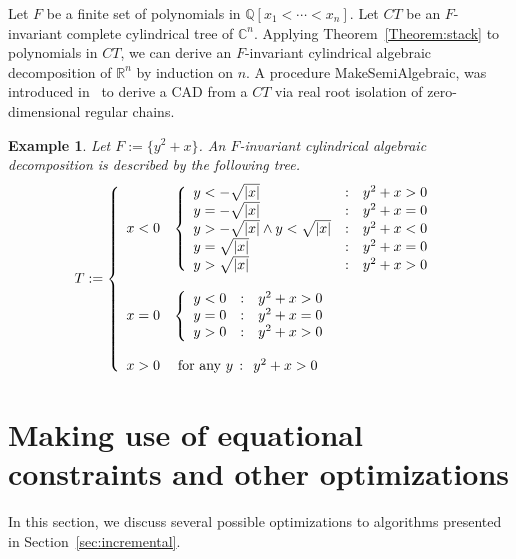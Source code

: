 \documentclass[10pt]{article}
\def\C {\ensuremath{\mathbb{C}}}
\def\Q {\ensuremath{\mathbb{Q}}}
\def\R {\ensuremath{\mathbb{R}}}
\newtheorem{Example}{Example}
\begin{document}
Let $F$ be a finite set of polynomials in $\Q[x_1<\cdots<x_n]$. 
Let $CT$ be an $F$-invariant complete cylindrical tree of $\C^n$.
Applying Theorem~\ref{Theorem:stack} to polynomials in $CT$, we can derive 
an $F$-invariant cylindrical algebraic decomposition of  $\R^n$ by induction on $n$.
A procedure {\sf MakeSemiAlgebraic}, was introduced in~\cite{CMXY09}
to derive a CAD from a $CT$ via real root isolation of zero-dimensional  regular chains.
\smallskip


\begin{Example}
Let $F := \{y^2+x\}$. 
An $F$-invariant cylindrical algebraic decomposition 
is described by the following tree.
$$
T := \left\{
\begin{array}{ll}
x < 0  & \left\{
        \begin{array}{lcl}
         y < -\sqrt{|x|}   &:& { y^2+x>0}\\
         y = -\sqrt{|x|}   &:& { y^2+x=0}\\
         y > -\sqrt{|x|}\wedge y<\sqrt{|x|}   &:& { y^2+x<0}\\
         y = \sqrt{|x|}   &:& { y^2+x=0}\\
         y > \sqrt{|x|}   &:& { y^2+x>0}
        \end{array}
        \right.\\
&\\
x = 0  & \left\{
        \begin{array}{rcl}
         y <0    &:& { y^2+x>0}\\
         y = 0   &:& { y^2+x=0}\\
         y > 0 &:& { y^2+x>0}
        \end{array}
        \right.\\
&\\
x> 0&   \;{\rm for~ any~}y\,  :\;\, { y^2+x > 0}
\end{array}
\right.
$$
\end{Example}

\section{Making use of equational constraints and other optimizations}
\label{sec:equation}
In this section, we discuss several possible optimizations 
to algorithms presented in Section~\ref{sec:incremental}. 
\end{document}
